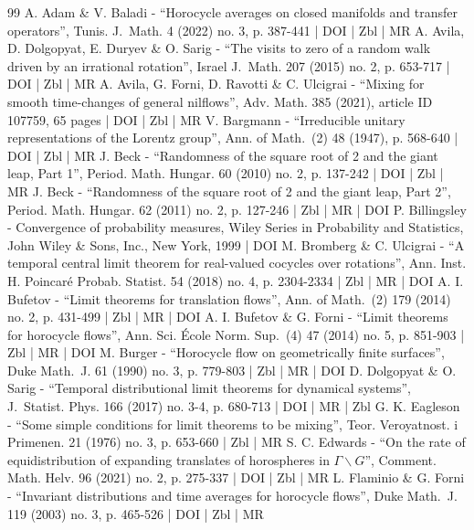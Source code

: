 \documentclass[10pt]{amsart}
\theoremstyle{definition}
\begin{document}
\begin{thebibliography}{99}
A. Adam \& V. Baladi - “Horocycle averages on closed manifolds and transfer operators”, Tunis. J. Math. 4 (2022) no. 3, p. 387-441 | DOI | Zbl | MR
A. Avila, D. Dolgopyat, E. Duryev \& O. Sarig - “The visits to zero of a random walk driven by an irrational rotation”, Israel J. Math. 207 (2015) no. 2, p. 653-717 | DOI | Zbl | MR
A. Avila, G. Forni, D. Ravotti \& C. Ulcigrai - “Mixing for smooth time-changes of general nilflows”, Adv. Math. 385 (2021), article ID 107759, 65 pages | DOI | Zbl | MR
V. Bargmann - “Irreducible unitary representations of the Lorentz group”, Ann. of Math. (2) 48 (1947), p. 568-640 | DOI | Zbl | MR
J. Beck - “Randomness of the square root of 2 and the giant leap, Part 1”, Period. Math. Hungar. 60 (2010) no. 2, p. 137-242 | DOI | Zbl | MR
J. Beck - “Randomness of the square root of 2 and the giant leap, Part 2”, Period. Math. Hungar. 62 (2011) no. 2, p. 127-246 | Zbl | MR | DOI
P. Billingsley - Convergence of probability measures, Wiley Series in Probability and Statistics, John Wiley \& Sons, Inc., New York, 1999 | DOI
M. Bromberg \& C. Ulcigrai - “A temporal central limit theorem for real-valued cocycles over rotations”, Ann. Inst. H. Poincaré Probab. Statist. 54 (2018) no. 4, p. 2304-2334 | Zbl | MR | DOI
A. I. Bufetov - “Limit theorems for translation flows”, Ann. of Math. (2) 179 (2014) no. 2, p. 431-499 | Zbl | MR | DOI
A. I. Bufetov \& G. Forni - “Limit theorems for horocycle flows”, Ann. Sci. École Norm. Sup. (4) 47 (2014) no. 5, p. 851-903 | Zbl | MR | DOI
M. Burger - “Horocycle flow on geometrically finite surfaces”, Duke Math. J. 61 (1990) no. 3, p. 779-803 | Zbl | MR | DOI
D. Dolgopyat \& O. Sarig - “Temporal distributional limit theorems for dynamical systems”, J. Statist. Phys. 166 (2017) no. 3-4, p. 680-713 | DOI | MR | Zbl
G. K. Eagleson - “Some simple conditions for limit theorems to be mixing”, Teor. Veroyatnost. i Primenen. 21 (1976) no. 3, p. 653-660 | Zbl | MR
S. C. Edwards - “On the rate of equidistribution of expanding translates of horospheres in $\Gamma \backslash G$”, Comment. Math. Helv. 96 (2021) no. 2, p. 275-337 | DOI | Zbl | MR
L. Flaminio \& G. Forni - “Invariant distributions and time averages for horocycle flows”, Duke Math. J. 119 (2003) no. 3, p. 465-526 | DOI | Zbl | MR

\end{thebibliography}
\end{document}
